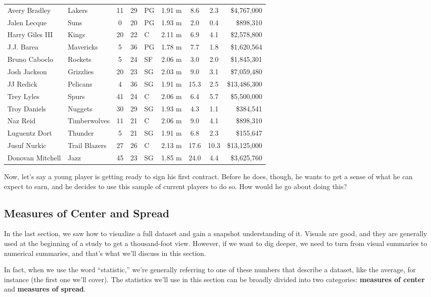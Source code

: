 \begin{center}
{\begin{tabular}{l l c c l c c c r}
Avery Bradley & Lakers & 11 & 29 & PG & 1.91 m & 8.6 & 2.3 & \$4,767,000\\
Jalen Lecque & Suns & 0 & 20 & PG & 1.93 m & 2.0 & 0.4 & \$898,310\\
Harry Giles III & Kings & 20 & 22 & C & 2.11 m & 6.9 & 4.1 & \$2,578,800\\
J.J. Barea & Mavericks & 5 & 36 & PG & 1.78 m & 7.7 & 1.8 & \$1,620,564\\
Bruno Caboclo & Rockets & 5 & 24 & SF & 2.06 m & 3.0 & 2.0 & \$1,845,301\\
Josh Jackson & Grizzlies & 20 & 23 & SG & 2.03 m & 9.0 & 3.1 & \$7,059,480\\
JJ Redick & Pelicans & 4 & 36 & SG & 1.91 m & 15.3 & 2.5 & \$13,486,300\\
Trey Lyles & Spurs & 41 & 24 & C & 2.06 m & 6.4 & 5.7 & \$5,500,000\\
Troy Daniels & Nuggets & 30 & 29 & SG & 1.93 m & 4.3 & 1.1 & \$384,541\\
Naz Reid & Timberwolves & 11 & 21 & C & 2.06 m & 9.0 & 4.1 & \$898,310\\
Luguentz Dort & Thunder & 5 & 21 & SG & 1.91 m & 6.8 & 2.3 & \$155,647\\
Jusuf Nurkic & Trail Blazers & 27 & 26 & C & 2.13 m & 17.6 & 10.3 & \$13,125,000\\
Donovan Mitchell & Jazz & 45 & 23 & SG & 1.85 m & 24.0 & 4.4 & \$3,625,760
\end{tabular}}
\end{center}

Now, let's say a young player is getting ready to sign his first contract.  Before he does, though, he wants to get a sense of what he can expect to earn, and he decides to use this sample of current players to do so.  How would he go about doing this?\\

\subsection{Measures of Center and Spread}
In the last section, we saw how to visualize a full dataset and gain a snapshot understanding of it.  Visuals are good, and they are generally used at the beginning of a study to get a thousand-foot view.  However, if we want to dig deeper, we need to turn from visual summaries to numerical summaries, and that's what we'll discuss in this section.

In fact, when we use the word ``statistic,'' we're generally referring to one of these numbers that describe a dataset, like the average, for instance (the first one we'll cover).  The statistics we'll use in this section can be broadly divided into two categories: \textbf{measures of center} and \textbf{measures of spread}.


